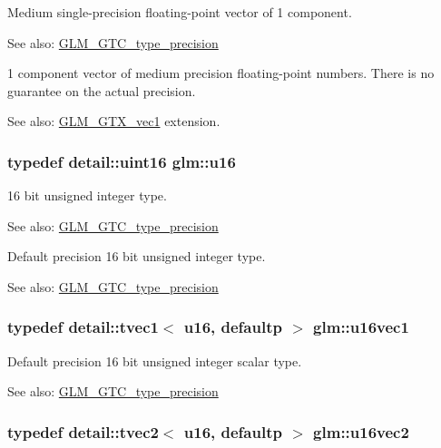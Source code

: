Medium single-precision floating-point vector of 1 component. \begin{Desc}
\item[See also:]\hyperlink{group__gtc__type__precision}{GLM\_\-GTC\_\-type\_\-precision}\end{Desc}
1 component vector of medium precision floating-point numbers. There is no guarantee on the actual precision. \begin{Desc}
\item[See also:]\hyperlink{group__gtx__vec1}{GLM\_\-GTX\_\-vec1} extension. \end{Desc}
\hypertarget{group__gtc__type__precision_ge7a1571503f83d2264ddfa705a6b082a}{
\subsubsection[u16]{\setlength{\rightskip}{0pt plus 5cm}typedef detail::uint16 {\bf glm::u16}}}
\label{group__gtc__type__precision_ge7a1571503f83d2264ddfa705a6b082a}


16 bit unsigned integer type. \begin{Desc}
\item[See also:]\hyperlink{group__gtc__type__precision}{GLM\_\-GTC\_\-type\_\-precision}\end{Desc}
Default precision 16 bit unsigned integer type. \begin{Desc}
\item[See also:]\hyperlink{group__gtc__type__precision}{GLM\_\-GTC\_\-type\_\-precision} \end{Desc}
\hypertarget{group__gtc__type__precision_g95324b9d781c51a6d31b05fcc63c5cbe}{
\subsubsection[u16vec1]{\setlength{\rightskip}{0pt plus 5cm}typedef detail::tvec1$<$ u16, defaultp $>$ {\bf glm::u16vec1}}}
\label{group__gtc__type__precision_g95324b9d781c51a6d31b05fcc63c5cbe}


Default precision 16 bit unsigned integer scalar type. \begin{Desc}
\item[See also:]\hyperlink{group__gtc__type__precision}{GLM\_\-GTC\_\-type\_\-precision} \end{Desc}
\hypertarget{group__gtc__type__precision_g4beac509930099bb494b4bd0a44c49f2}{
\subsubsection[u16vec2]{\setlength{\rightskip}{0pt plus 5cm}typedef detail::tvec2$<$ u16, defaultp $>$ {\bf glm::u16vec2}}}
\label{group__gtc__type__precision_g4beac509930099bb494b4bd0a44c49f2}


